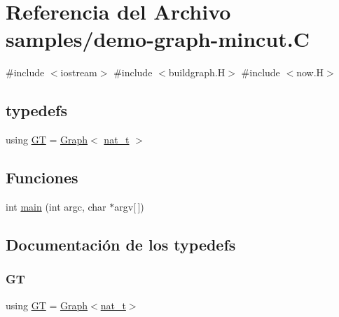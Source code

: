 \hypertarget{demo-graph-mincut_8_c}{}\section{Referencia del Archivo samples/demo-\/graph-\/mincut.C}
\label{demo-graph-mincut_8_c}
{\ttfamily \#include $<$iostream$>$}\newline
{\ttfamily \#include $<$buildgraph.\+H$>$}\newline
{\ttfamily \#include $<$now.\+H$>$}\newline
\subsection*{typedefs}
\begin{DoxyCompactItemize}
\item 
using \hyperlink{demo-graph-mincut_8_c_a3001c40d2c31ca87ed96cd7d1334a55e}{GT} = \hyperlink{class_designar_1_1_graph}{Graph}$<$ \hyperlink{namespace_designar_aa72662848b9f4815e7bf31a7cf3e33d1}{nat\+\_\+t} $>$
\end{DoxyCompactItemize}
\subsection*{Funciones}
\begin{DoxyCompactItemize}
\item 
int \hyperlink{demo-graph-mincut_8_c_a0ddf1224851353fc92bfbff6f499fa97}{main} (int argc, char $\ast$argv\mbox{[}$\,$\mbox{]})
\end{DoxyCompactItemize}


\subsection{Documentación de los \textquotesingle{}typedefs\textquotesingle{}}
\mbox{\label{demo-graph-mincut_8_c_a3001c40d2c31ca87ed96cd7d1334a55e}} 
\subsubsection{\texorpdfstring{GT}{GT}}
{\footnotesize\ttfamily using \hyperlink{demo-buildgraph_8_c_a3001c40d2c31ca87ed96cd7d1334a55e}{GT} =  \hyperlink{class_designar_1_1_graph}{Graph}$<$\hyperlink{namespace_designar_aa72662848b9f4815e7bf31a7cf3e33d1}{nat\+\_\+t}$>$}




